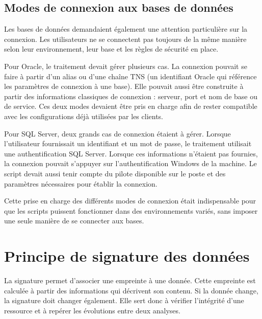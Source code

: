 \subsection{Modes de connexion aux bases de données}
\label{subsec:modes_connexion_bases}

Les bases de données demandaient également une attention particulière sur la
connexion. Les utilisateurs ne se connectent pas toujours de la même manière
selon leur environnement, leur base et les règles de sécurité en place.

Pour Oracle, le traitement devait gérer plusieurs cas. La connexion pouvait se
faire à partir d'un alias ou d'une chaîne TNS (un identifiant Oracle qui référence
les paramètres de connexion à une base). Elle pouvait aussi être construite à partir des
informations classiques de connexion : serveur, port et nom de base ou de
service. Ces deux modes devaient être pris en charge afin de rester compatible
avec les configurations déjà utilisées par les clients.

Pour SQL Server, deux grands cas de connexion étaient à gérer. Lorsque
l'utilisateur fournissait un identifiant et un mot de passe, le traitement
utilisait une authentification SQL Server. Lorsque ces informations n'étaient
pas fournies, la connexion pouvait s'appuyer sur l'authentification Windows de
la machine. Le script devait aussi tenir compte du pilote disponible sur le
poste et des paramètres nécessaires pour établir la connexion.

Cette prise en charge des différents modes de connexion était indispensable
pour que les scripts puissent fonctionner dans des environnements variés, sans
imposer une seule manière de se connecter aux bases.


\section{Principe de signature des données}
\label{sec:principe_signature_donnees}

La signature permet d'associer une empreinte à une donnée. Cette empreinte est
calculée à partir des informations qui décrivent son contenu. Si la donnée
change, la signature doit changer également. Elle sert donc à vérifier
l'intégrité d'une ressource et à repérer les évolutions entre deux analyses.


